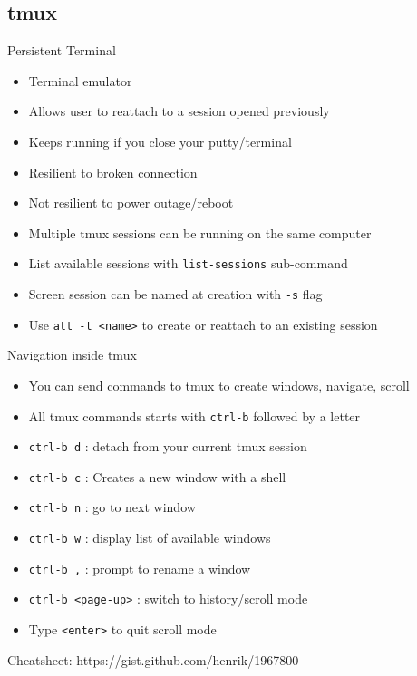 \subsection{tmux}

\begin{frame}{Persistent Terminal}
\begin{itemize}
\pause \item Terminal emulator
\pause \item Allows user to reattach to a session opened previously
\pause \item Keeps running if you close your putty/terminal
\pause \item Resilient to broken connection
\pause \item Not resilient to power outage/reboot
\pause \item Multiple tmux sessions can be running on the same computer
\pause \item List available sessions with \texttt{list-sessions} sub-command
\pause \item Screen session can be named at creation with \texttt{-s} flag
\pause \item Use \texttt{att -t <name>} to create or reattach to an existing session
\end{itemize}
\end{frame}

\begin{frame}{Navigation inside tmux}
\begin{itemize}
  \pause \item You can send commands to tmux to create windows, navigate, scroll
  \pause \item All tmux commands starts with \texttt{ctrl-b} followed by a letter
  \pause \item \texttt{ctrl-b d} : detach from your current tmux session
  \pause \item \texttt{ctrl-b c} : Creates a new window with a shell
  \pause \item \texttt{ctrl-b n} : go to next window
  \pause \item \texttt{ctrl-b w} : display list of available windows
  \pause \item \texttt{ctrl-b ,} : prompt to rename a window
  \pause \item \texttt{ctrl-b <page-up>} : switch to history/scroll mode
  \pause \item Type \texttt{<enter>} to quit scroll mode
\end{itemize}
\pause
Cheatsheet: https://gist.github.com/henrik/1967800
\end{frame}

